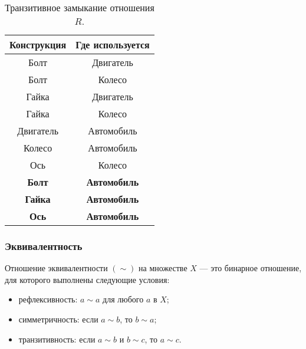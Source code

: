 \documentclass[12pt]{matmex-diploma}
\begin{document}
            \begin{table}[htb]
                \centering
                \begin{tabular}{|c|c|}
                    \hline
                    \textbf{Конструкция} & \textbf{Где используется} \\ \hline
                    Болт                 & Двигатель                 \\ \hline
                    Болт                 & Колесо                    \\ \hline
                    Гайка                & Двигатель                 \\ \hline
                    Гайка                & Колесо                    \\ \hline
                    Двигатель            & Автомобиль                \\ \hline
                    Колесо               & Автомобиль                \\ \hline
                    Ось                  & Колесо                    \\ \hline
                    \textbf{Болт}        & \textbf{Автомобиль}       \\ \hline
                    \textbf{Гайка}       & \textbf{Автомобиль}       \\ \hline
                    \textbf{Ось}         & \textbf{Автомобиль}       \\ \hline
                \end{tabular}
                \caption{Транзитивное замыкание отношения $R$.}
            \end{table}            
                            
        \subsubsection*{Эквивалентность}
            Отношение эквивалентности $(\sim)$ на множестве $X$ — это бинарное отношение, для которого выполнены следующие условия:
            \begin{itemize}
                \item рефлексивность: $a\sim a$ для любого $a$ в $X$;
                \item симметричность: если $a\sim b$, то $b\sim a$;
                \item транзитивность: если $a\sim b$ и $b\sim c$, то $a\sim c$.
            \end{itemize}
\end{document}
